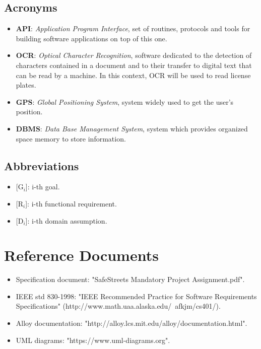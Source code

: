 \documentclass{report}
\begin{document}
\subsection{Acronyms}
\begin{itemize}
\item \textbf{API}: \textit{Application Program Interface}, set of routines, protocols and tools for building software applications on top of this one.
\item \textbf{OCR}: \textit{Optical Character Recognition}, software dedicated to the detection of characters contained in a document and to their transfer to digital text that can be read by a machine. In this context, OCR will be used to read license plates.
\item \textbf{GPS}: \textit{Global Positioning System}, system widely used to get the user's position.
\item \textbf{DBMS}: \textit{Data Base Management System}, system which provides organized space memory to store information.
\end{itemize}
\subsection{Abbreviations}
\begin{itemize}
\item {[G$_{i}$]}: i-th goal.
\item {[R$_{i}$]}: i-th functional requirement.
\item {[D$_{i}$]}: i-th domain assumption.
\end{itemize}
\section{Reference Documents}
\begin{itemize}
	\item Specification document: "SafeStreets Mandatory Project Assignment.pdf".
	\item IEEE std 830-1998: "IEEE Recommended Practice for Software Requirements Specifications" (http://www.math.uaa.alaska.edu/~afkjm/cs401/).
	\item Alloy documentation: "http://alloy.lcs.mit.edu/alloy/documentation.html".
	\item UML diagrams: "https://www.uml-diagrams.org".
\end{itemize}
\end{document}
